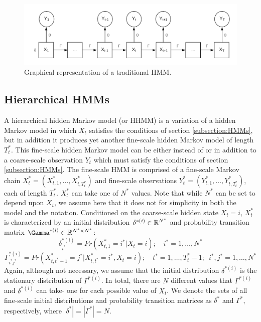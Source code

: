 \begin{figure}[h!]
	\centering
	\includegraphics[width=5in]{../Plots/HMM.png}
	\caption{Graphical representation of a traditional HMM.}
	\label{fig:HMM}
\end{figure}

\subsection{Hierarchical HMMs}

A hierarchical hidden Markov model (or HHMM) is a variation of a hidden Markov model in which $X_t$ satisfies the conditions of section \ref{subsection:HMMs}, but in addition it produces yet another fine-scale hidden Markov model of length $T_t^*$. This fine-scale hidden Markov model can be either instead of \cite{Barajas:2017} or in addition to \cite{Adam:2019} a coarse-scale observation $Y_t$ which must satisfy the conditions of section \ref{subsection:HMMs}. The fine-scale HMM is comprised of a fine-scale Markov chain $X^*_t = (X^*_{t,1}, \ldots, X^*_{t,T^*_t})$ and fine-scale observations $Y^*_t = (Y^*_{t,1}, \ldots, Y^*_{t,T^*_t})$, each of length $T^*_t$. $X^*_t$ can take one of $N^*$ values. Note that while $N^*$ can be set to depend upon $X_t$, we assume here that it does not for simplicity in both the model and the notation. Conditioned on the coarse-scale hidden state $X_t = i$, $X^*_t$ is characterized by an initial distribution $\delta^{*(i)} \in \mathbb{R}^{N^*}$ and probability transition matrix $\Gamma^{*(i)} \in \bbR^{N^* \times N^*}$:
%
$$\delta^{*(i)}_{i^*} = Pr(X^*_{t,1} = i^* | X_t = i); \quad i^* = 1,\ldots,N^*$$
%
$$\Gamma^{*(i)}_{i^*j^*} = Pr(X^*_{t,t^*+1} = j^* | X^*_{t,t^*} = i^*, X_t = i); \quad t^* = 1, \ldots, T^*_t-1; \enspace i^*,j^* = 1,\ldots,N^*$$
%
Again, although not necessary, we assume that the initial distribution $\delta^{*(i)}$ is the stationary distribution of $\Gamma^{*(i)}$. In total, there are $N$ different values that $\Gamma^{*(i)}$ and $\delta^{*(i)}$ can take- one for each possible value of $X_t$. We denote the sets of all fine-scale initial distributions and probability transition matrices as $\delta^*$ and $\Gamma^*$, respectively, where $|\delta^*| = |\Gamma^*| = N$.

